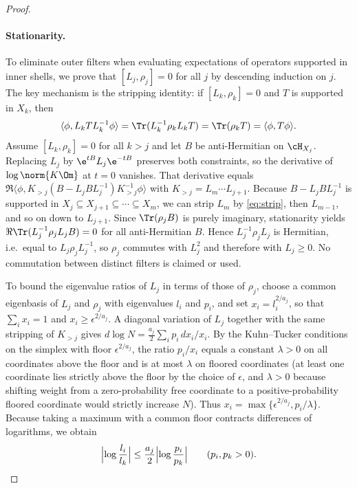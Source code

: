 \begin{proof}
\paragraph{Stationarity.}
To eliminate outer filters when evaluating expectations of operators
supported in inner shells, we prove that $[L_j,\rho_j]=0$ for all $j$ by
descending induction on $j$. The key mechanism is the stripping identity:
if $[L_k,\rho_k]=0$ and $T$ is supported in $X_k$, then
\begin{equation}\label{eq:strip}
 \langle\phi,L_kTL_k^{-1}\phi\rangle=\Tr(L_k^{-1}\rho_kL_kT)=\Tr(\rho_kT)=\langle\phi,T\phi\rangle .
\end{equation}
Assume $[L_k,\rho_k]=0$ for all $k>j$ and let $B$ be anti-Hermitian on
$\cH_{X_j}$. Replacing $L_j$ by $\e^{tB}L_j\e^{-tB}$ preserves both
constraints, so the derivative of $\log\norm{K\Om}$ at $t=0$ vanishes.
That derivative equals
$\Re\langle\phi,K_{>j}(B-L_jBL_j^{-1})K_{>j}^{-1}\phi\rangle$ with
$K_{>j}=L_m\cdots L_{j+1}$. Because $B-L_jBL_j^{-1}$ is supported in
$X_j\subseteq X_{j+1}\subseteq\cdots\subseteq X_m$, we can strip $L_m$ by
\eqref{eq:strip}, then $L_{m-1}$, and so on down to $L_{j+1}$. Since
$\Tr(\rho_jB)$ is purely imaginary, stationarity yields
$\Re\Tr(L_j^{-1}\rho_jL_jB)=0$ for all anti-Hermitian $B$. Hence
$L_j^{-1}\rho_jL_j$ is Hermitian, i.e.\ equal to $L_j\rho_jL_j^{-1}$, so
$\rho_j$ commutes with $L_j^2$ and therefore with $L_j\ge0$. No
commutation between distinct filters is claimed or used.

To bound the eigenvalue ratios of $L_j$ in terms of those of $\rho_j$,
choose a common eigenbasis of $L_j$ and $\rho_j$ with eigenvalues $l_i$
and $p_i$, and set $x_i=l_i^{2/a_j}$, so that $\sum_ix_i=1$ and
$x_i\ge\epsilon^{2/a_j}$. A diagonal variation of $L_j$ together with the
same stripping of $K_{>j}$ gives
$d\log N=\frac{a_j}2\sum_ip_i\,dx_i/x_i$. By the Kuhn--Tucker conditions
on the simplex with floor $\epsilon^{2/a_j}$, the ratio $p_i/x_i$ equals a
constant $\lambda>0$ on all coordinates above the floor and is at most
$\lambda$ on floored coordinates (at least one coordinate lies strictly
above the floor by the choice of $\epsilon$, and $\lambda>0$ because
shifting weight from a zero-probability free coordinate to a
positive-probability floored coordinate would strictly increase $N$). Thus
$x_i=\max\{\epsilon^{2/a_j},p_i/\lambda\}$. Because taking a maximum with
a common floor contracts differences of logarithms, we obtain
\begin{equation}\label{eq:clip}
 \Bigl|\log\frac{l_i}{l_k}\Bigr|\le\frac{a_j}{2}\Bigl|\log\frac{p_i}{p_k}\Bigr|
 \qquad(p_i,p_k>0).
\end{equation}


\end{proof}
